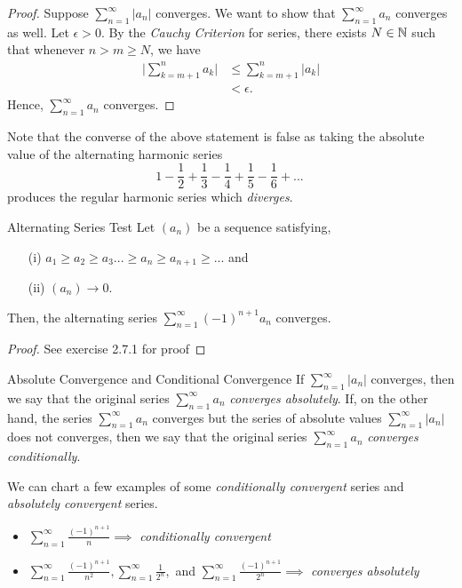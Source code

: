 \begin{proof}
    Suppose \( \sum_{n=1}^{\infty}|a_n|\) converges. We want to show that \( \sum_{n=1}^{\infty} a_n\) converges as well. Let \(\epsilon > 0 \). By the \textit{Cauchy Criterion} for series, there exists \( N \in \mathbb{N} \) such that whenever \( n > m \geq N \), we have 
\begin{align*}
    \Big|\sum_{k=m+1}^{n} a_k \Big|&\leq \sum_{k=m+1}^{n} |a_k| \\
                     &< \epsilon.
\end{align*}
Hence, \( \sum_{n=1}^{\infty} a_n \) converges.
\end{proof}

Note that the converse of the above statement is false as taking the absolute value of the alternating harmonic series 
\[ 1 - \frac{1}{2} + \frac{1}{3} - \frac{1}{4} + \frac{1}{5} - \frac{1}{6} + ... ~  \]
produces the regular harmonic series which \textit{diverges}.

\begin{theorem}{Alternating Series Test}{}
    Let \((a_n)\) be a sequence satisfying, 
    \begin{enumerate}
        \item[(i)] \( a_1 \geq a_2 \geq a_3 ... \geq a_n \geq a_{n+1} \geq ... \) and
        \item[(ii)] \((a_n) \to 0\).
    \end{enumerate}
    Then, the alternating series \( \sum_{n=1}^{\infty} (-1)^{n+1} a_n\) converges.
\end{theorem}
\begin{proof}
See exercise 2.7.1 for proof
\end{proof}

\begin{definition}{Absolute Convergence and Conditional Convergence}{}
If \( \sum_{n=1}^{\infty} |a_n| \) converges, then we say that the original series \( \sum_{n=1}^{\infty} a_n \) \textit{converges absolutely}. If, on the other hand, the series \( \sum_{n=1}^{\infty} a_n \) converges but the series of absolute values \( \sum_{n=1}^{\infty} |a_n|\) does not converges, then we say that the original series \(\sum_{n=1}^{\infty} a_n \) \textit{converges conditionally}.
\end{definition}

We can chart a few examples of some \textit{conditionally convergent } series and \textit{absolutely convergent} series.

\begin{itemize}
    \item \(\sum_{n=1}^{\infty} \frac{(-1)^{n+1}}{n} \implies \) \textit{conditionally convergent}
    \item \(\sum_{n=1}^{\infty} \frac{(-1)^{n+1}}{n^2}, \sum_{n=1}^{\infty} \frac{1}{2^n},  \) and \( \sum_{n=1}^{\infty} \frac{(-1)^{n+1}}{2^n} \implies \) \textit{converges absolutely} 
\end{itemize}

